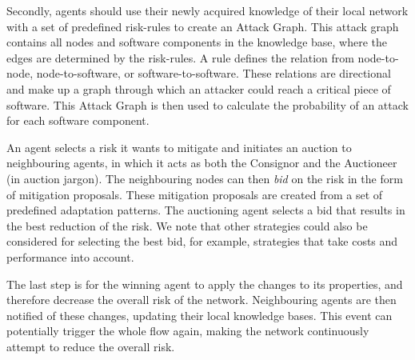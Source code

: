 Secondly, agents should use their newly acquired knowledge of their local network with a set of predefined risk-rules to create an Attack Graph. This attack graph contains all nodes and software components in the knowledge base, where the edges are determined by the risk-rules. A rule defines the relation from node-to-node, node-to-software, or software-to-software. These relations are directional and make up a graph through which an attacker could reach a critical piece of software. This Attack Graph is then used to calculate the probability of an attack for each software component. 

An agent selects a risk it wants to mitigate and initiates an auction to neighbouring agents, in which it acts as both the Consignor and the Auctioneer (in auction jargon).  
The neighbouring nodes can then \emph{bid} on the risk in the form of mitigation proposals. These mitigation proposals are created from a set of predefined adaptation patterns. The auctioning agent selects a bid that results in the best reduction of the risk. We note that other strategies could also be considered for selecting the best bid, for example, strategies that take costs and performance into account.

The last step is for the winning agent to apply the changes to its properties, and therefore decrease the overall risk of the network. Neighbouring agents are then notified of these changes, updating their local knowledge bases. This event can potentially trigger the whole flow again, making the network continuously attempt to reduce the overall risk.